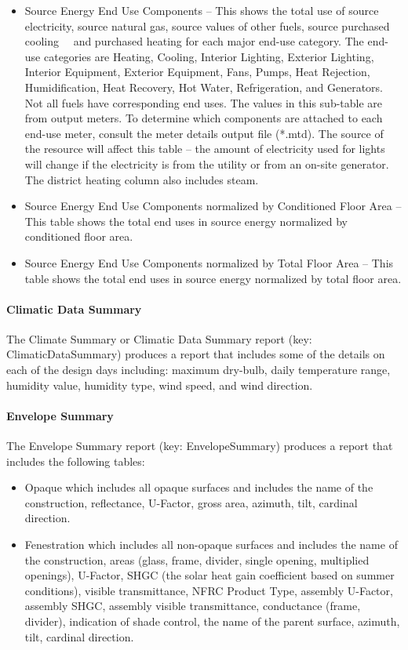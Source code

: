 \begin{itemize}
\item
  Source Energy End Use Components -- This shows the total use of source electricity, source natural gas, source values of other fuels, source purchased cooling~~ and purchased heating for each major end-use category. The end-use categories are Heating, Cooling, Interior Lighting, Exterior Lighting, Interior Equipment, Exterior Equipment, Fans, Pumps, Heat Rejection, Humidification, Heat Recovery, Hot Water, Refrigeration, and Generators. Not all fuels have corresponding end uses. The values in this sub-table are from output meters. To determine which components are attached to each end-use meter, consult the meter details output file (*.mtd). The source of the resource will affect this table -- the amount of electricity used for lights will change if the electricity is from the utility or from an on-site generator. The district heating column also includes steam.
\item
  Source Energy End Use Components normalized by Conditioned Floor Area -- This table shows the total end uses in source energy normalized by conditioned floor area.
\item
  Source Energy End Use Components normalized by Total Floor Area -- This table shows the total end uses in source energy normalized by total floor area.
\end{itemize}

\paragraph{Climatic Data Summary}\label{climatic-data-summary}

The Climate Summary or Climatic Data Summary report (key: ClimaticDataSummary) produces a report that includes some of the details on each of the design days including: maximum dry-bulb, daily temperature range, humidity value, humidity type, wind speed, and wind direction.

\paragraph{Envelope Summary}\label{envelope-summary}

The Envelope Summary report (key: EnvelopeSummary) produces a report that includes the following tables:

\begin{itemize}
\item
  Opaque which includes all opaque surfaces and includes the name of the construction, reflectance, U-Factor, gross area, azimuth, tilt, cardinal direction.
\item
  Fenestration which includes all non-opaque surfaces and includes the name of the construction, areas (glass, frame, divider, single opening, multiplied openings), U-Factor, SHGC (the solar heat gain coefficient based on summer conditions), visible transmittance, NFRC Product Type, assembly U-Factor, assembly SHGC, assembly visible transmittance, conductance (frame, divider), indication of shade control, the name of the parent surface, azimuth, tilt, cardinal direction. 
\end{itemize}

